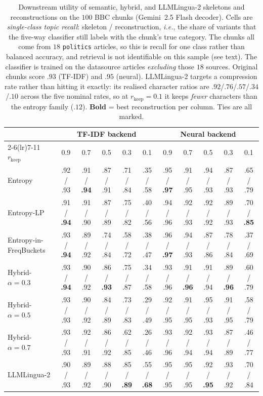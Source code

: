 \documentclass[11pt]{article}
\newcommand{\rkeep}{r_{\mathrm{keep}}}
\begin{document}
\begin{table}[tbp]
\centering
\footnotesize
\setlength{\tabcolsep}{3pt}
\caption{Downstream utility of semantic, hybrid, and LLMLingua-2 skeletons and reconstructions on the
$100$ BBC chunks (Gemini~2.5 Flash decoder). Cells are \emph{single-class topic recall}: skeleton / reconstruction, {\em i.e.}, the share of
variants that the five-way classifier still labels with the chunk's true category. The chunks all come from
$18$ \texttt{politics} articles, so this is recall for one class rather than balanced accuracy, and
retrieval is not identifiable on this sample (see text). The classifier is trained on the datasource
articles \emph{excluding} those $18$ sources. Original chunks score $.93$ (TF-IDF) and $.95$ (neural).
LLMLingua-2 targets a compression rate rather than hitting it exactly: its realised character ratios are $.92$/$.76$/$.57$/$.34$/$.10$ across the five nominal rates, so at $\rkeep = 0.1$ it keeps \emph{fewer} characters than the entropy family ($.12$). \textbf{Bold} = best reconstruction per column. Ties are all marked.}
\label{tab:downstream_sem}
\begin{tabular}{l ccccc ccccc}
\toprule
& \multicolumn{5}{c}{\textbf{TF-IDF backend}} & \multicolumn{5}{c}{\textbf{Neural backend}} \\
\cmidrule(lr){2-6}\cmidrule(lr){7-11}
$\rkeep$ & 0.9 & 0.7 & 0.5 & 0.3 & 0.1 & 0.9 & 0.7 & 0.5 & 0.3 & 0.1 \\
\midrule
Entropy                    & .92 / .93 & .91 / \textbf{.94} & .87 / .91 & .71 / .84 & .35 / .58 & .95 / \textbf{.97} & .91 / .95 & .94 / .93 & .87 / .93 & .65 / .79 \\
Entropy-LP                 & .91 / \textbf{.94} & .91 / .90 & .87 / .89 & .75 / .82 & .40 / .56 & .94 / .96 & .92 / .93 & .92 / .92 & .89 / .93 & .70 / \textbf{.85} \\
Entropy-in-FreqBuckets     & .93 / \textbf{.94} & .89 / .92 & .74 / .84 & .58 / .72 & .38 / .47 & .96 / \textbf{.97} & .94 / .93 & .87 / .86 & .78 / .84 & .37 / .69 \\
Hybrid-$\alpha{=}0.3$      & .93 / \textbf{.94} & .90 / .92 & .86 / \textbf{.93} & .75 / .87 & .34 / .58 & .93 / .96 & .91 / \textbf{.96} & .91 / .94 & .89 / \textbf{.96} & .60 / .79 \\
Hybrid-$\alpha{=}0.5$      & .93 / .93 & .90 / .92 & .84 / .89 & .73 / .83 & .29 / .49 & .92 / .95 & .91 / .95 & .95 / .93 & .91 / .95 & .58 / .79 \\
Hybrid-$\alpha{=}0.7$      & .93 / .93 & .92 / .91 & .86 / .92 & .62 / .85 & .26 / .46 & .93 / .96 & .92 / .94 & .93 / .94 & .87 / .89 & .46 / .77 \\
LLMLingua-2                & .90 / .93 & .89 / .92 & .88 / .90 & .85 / \textbf{.89} & .55 / \textbf{.68} & .95 / .95 & .95 / .95 & .92 / \textbf{.95} & .93 / .92 & .70 / .84 \\
\bottomrule
\end{tabular}
\end{table}
\end{document}
